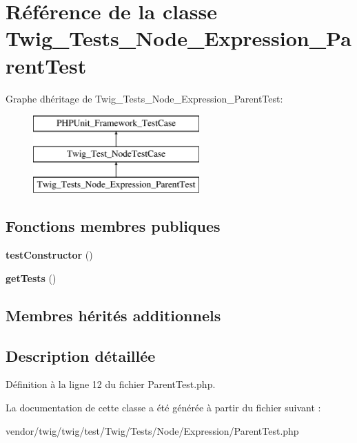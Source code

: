 \hypertarget{class_twig___tests___node___expression___parent_test}{}\section{Référence de la classe Twig\+\_\+\+Tests\+\_\+\+Node\+\_\+\+Expression\+\_\+\+Parent\+Test}
\label{class_twig___tests___node___expression___parent_test}
Graphe d\textquotesingle{}héritage de Twig\+\_\+\+Tests\+\_\+\+Node\+\_\+\+Expression\+\_\+\+Parent\+Test\+:\begin{figure}[H]
\begin{center}
\leavevmode
\includegraphics[height=3.000000cm]{class_twig___tests___node___expression___parent_test}
\end{center}
\end{figure}
\subsection*{Fonctions membres publiques}
\begin{DoxyCompactItemize}
\item 
{\bfseries test\+Constructor} ()\hypertarget{class_twig___tests___node___expression___parent_test_a47094dc941e72950570900d1418f89c6}{}\label{class_twig___tests___node___expression___parent_test_a47094dc941e72950570900d1418f89c6}

\item 
{\bfseries get\+Tests} ()\hypertarget{class_twig___tests___node___expression___parent_test_a7e247dd31cc8d37a6c97353a062a0080}{}\label{class_twig___tests___node___expression___parent_test_a7e247dd31cc8d37a6c97353a062a0080}

\end{DoxyCompactItemize}
\subsection*{Membres hérités additionnels}


\subsection{Description détaillée}


Définition à la ligne 12 du fichier Parent\+Test.\+php.



La documentation de cette classe a été générée à partir du fichier suivant \+:\begin{DoxyCompactItemize}
\item 
vendor/twig/twig/test/\+Twig/\+Tests/\+Node/\+Expression/Parent\+Test.\+php\end{DoxyCompactItemize}
